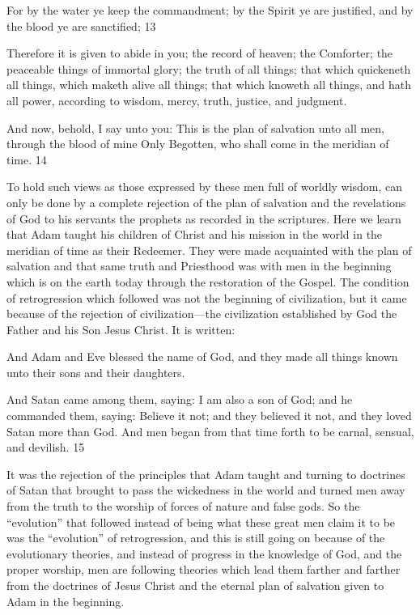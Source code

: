 For by the water ye keep the commandment; by the Spirit ye are justified, and by the blood
ye are sanctified; 13

Therefore it is given to abide in you; the record of heaven; the Comforter; the peaceable
things of immortal glory; the truth of all things; that which quickeneth all things, which
maketh alive all things; that which knoweth all things, and hath all power, according to
wisdom, mercy, truth, justice, and judgment.

And now, behold, I say unto you: This is the plan of salvation unto all men, through the
blood of mine Only Begotten, who shall come in the meridian of time. 14

To hold such views as those expressed by these men full of worldly wisdom, can only be
done by a complete rejection of the plan of salvation and the revelations of God to his
servants the prophets as recorded in the scriptures. Here we learn that Adam taught his
children of Christ and his mission in the world in the meridian of time as their Redeemer.
They were made acquainted with the plan of salvation and that same truth and Priesthood
was with men in the beginning which is on the earth today through the restoration of the
Gospel. The condition of retrogression which followed was not the beginning of civilization,
but it came because of the rejection of civilization—the civilization established by God the
Father and his Son Jesus Christ. It is written:

And Adam and Eve blessed the name of God, and they made all things known unto their sons
and their daughters.

And Satan came among them, saying: I am also a son of God; and he commanded them,
saying: Believe it not; and they believed it not, and they loved Satan more than God. And
men began from that time forth to be carnal, sensual, and devilish. 15

It was the rejection of the principles that Adam taught and turning to doctrines of Satan that
brought to pass the wickedness in the world and turned men away from the truth to the
worship of forces of nature and false gods. So the ``evolution'' that followed instead of being
what these great men claim it to be was the ``evolution'' of retrogression, and this is still going
on because of the evolutionary theories, and instead of progress in the knowledge of God,
and the proper worship, men are following theories which lead them farther and farther from
the doctrines of Jesus Christ and the eternal plan of salvation given to Adam in the
beginning.

